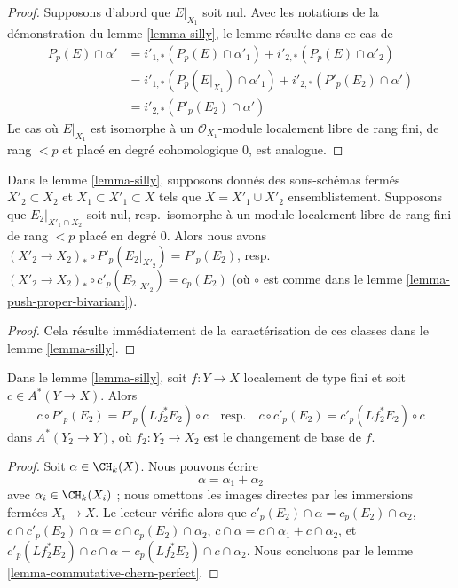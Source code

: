 \begin{proof}
Supposons d'abord que $E|_{X_1}$ soit nul.
Avec les notations de la démonstration du lemme \ref{lemma-silly},
le lemme résulte dans ce cas de
\begin{align*}
P_p(E) \cap \alpha'
& =
i'_{1, *}(P_p(E) \cap \alpha'_1) +
i'_{2, *}(P_p(E) \cap \alpha'_2) \\
& =
i'_{1, *}(P_p(E|_{X_1}) \cap \alpha'_1) +
i'_{2, *}(P'_p(E_2) \cap \alpha') \\
& =
i'_{2, *}(P'_p(E_2) \cap \alpha')
\end{align*}
Le cas où $E|_{X_1}$ est isomorphe à un
$\mathcal{O}_{X_1}$-module localement libre de rang fini, de rang $< p$ et placé en degré cohomologique $0$,
est analogue.
\end{proof}

\begin{lemma}
\label{lemma-silly-shrink}
Dans le lemme \ref{lemma-silly}, supposons donnés des sous-schémas fermés
$X'_2 \subset X_2$ et $X_1 \subset X'_1 \subset X$ tels que
$X = X'_1 \cup X'_2$ ensemblistement. Supposons que $E_2|_{X'_1 \cap X_2}$
soit nul, resp.\ isomorphe à un module localement libre de rang fini
de rang $< p$ placé en degré $0$. Alors nous avons
$(X'_2 \to X_2)_* \circ P'_p(E_2|_{X'_2}) = P'_p(E_2)$,
resp.\  $(X'_2 \to X_2)_* \circ c'_p(E_2|_{X'_2}) = c_p(E_2)$
(où $\circ$ est comme dans le lemme \ref{lemma-push-proper-bivariant}).
\end{lemma}

\begin{proof}
Cela résulte immédiatement de la caractérisation de ces classes
dans le lemme \ref{lemma-silly}.
\end{proof}

\begin{lemma}
\label{lemma-silly-commutes}
Dans le lemme \ref{lemma-silly}, soit $f : Y \to X$ localement de type fini
et soit $c \in A^*(Y \to X)$. Alors
$$
c \circ P'_p(E_2) = P'_p(Lf_2^*E_2) \circ c
\quad\text{resp.}\quad
c \circ c'_p(E_2) = c'_p(Lf_2^*E_2) \circ c
$$
dans $A^*(Y_2 \to Y)$, où $f_2 : Y_2 \to X_2$ est le changement de base de $f$.
\end{lemma}

\begin{proof}
Soit $\alpha \in \CH_k(X)$. Nous pouvons écrire
$$
\alpha = \alpha_1 + \alpha_2
$$
avec $\alpha_i \in \CH_k(X_i)$ ; nous omettons les images directes
par les immersions fermées $X_i \to X$. Le lecteur vérifie alors que
$c'_p(E_2) \cap \alpha = c_p(E_2) \cap \alpha_2$,
$c \cap c'_p(E_2) \cap \alpha = c \cap c_p(E_2) \cap \alpha_2$,
$c \cap \alpha = c \cap \alpha_1 + c \cap \alpha_2$, et
$c'_p(Lf_2^*E_2) \cap c \cap \alpha = c_p(Lf_2^*E_2) \cap c \cap \alpha_2$.
Nous concluons par le lemme \ref{lemma-commutative-chern-perfect}.
\end{proof}

